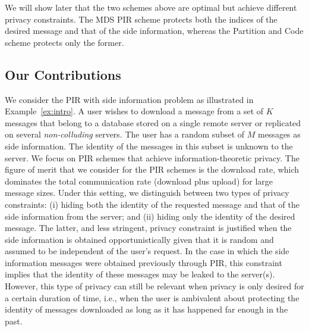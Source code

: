 \documentclass[letterpaper, 10 pt, conference]{ieeeconf}
\newcommand\alexn[1]{\notee[alex]{#1}}
\newcommand\swanand[1]{\notee[swanand]{#1}}
\begin{document}
We will show later that the two schemes above are optimal but achieve different privacy constraints. The MDS PIR scheme protects both the indices of the desired message and that of the side information, whereas the Partition and Code scheme protects only the former.



\subsection{Our Contributions}
\label{sec:contributions}
We consider the PIR with side information problem as illustrated in  Example~\ref{ex:intro}. A user wishes to download a message from a set of $K$ messages that belong to a database stored on a single remote server or replicated on several {\em non-colluding} servers. 
The user has  a random subset of $M$ messages as side information. The identity of the messages in this subset is unknown to the server. We focus on PIR schemes that achieve information-theoretic privacy. The figure of merit that we consider for  the PIR schemes is the download rate, which dominates the total communication rate (download plus upload) for large message sizes. Under this setting, we distinguish between two types of privacy constraints: (i) hiding both the  identity of the requested message and that of  the side information from the server; and (ii) hiding only the identity of the desired message. The latter, and  less stringent, privacy constraint is justified when the side information is obtained opportunistically given that  it is random and assumed to be independent of the user's request. In the case in which  the side information messages were  obtained previously through PIR, this constraint implies that the identity of these messages may be leaked to the server(s). However, this type of privacy can still be relevant when privacy is only desired for a certain duration of time, i.e., when the user is  ambivalent about protecting the identity of messages downloaded as long as it has happened far enough in the past.  
\end{document}
